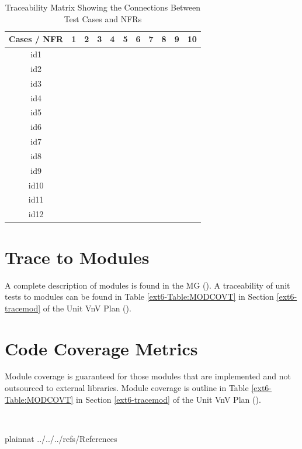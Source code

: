 \documentclass[12pt, titlepage]{article}
\begin{document}
\begin{table}[!h]
	\begin{center}
		\begin{tabular}{| c | c | c | c | c | c | c | c | c | c | c |}
			\hline
			Cases / NFR & 1 & 2 & 3 & 4 & 5 & 6 & 7 & 8 & 9 & 10\\
			\hline
			id1 & & & & & & & & & &\\
			\hline
			id2 & \checkmark& & & & & & & & &\\
			\hline
			id3 & & & & & & & & & &\\
			\hline
			id4 & & & & & & & & & &\\
			\hline
			id5 & & & & & & & & & &\\
			\hline
			id6 & & & & & & & & & &\\
			\hline
			id7 & & & & & & & & & &\\
			\hline
			id8 & \checkmark& & & & & & & & &\\
			\hline
			id9 & & & & & & & & & &\\
			\hline
			id10 & & & & & & & & & &\\
			\hline
			id11 & & & \checkmark& & & & & & &\\
			\hline
			id12 & & & & & & & & \checkmark& &\\
			\hline
		\end{tabular}
		\caption{Traceability Matrix Showing the Connections Between Test Cases and NFRs}
		\label{Table:TRCNFR}
	\end{center}
\end{table}  


\newpage
		
\section{Trace to Modules}	
\label{modulecoverage}	

A complete description of modules is found in the MG (\citet{LBM_MG_PM}). A traceability of unit tests to modules can be found in Table \ref{ext6-Table:MODCOVT} in Section \ref{ext6-tracemod} of the Unit VnV Plan (\citet{LBM_UVNV_PM}).

\section{Code Coverage Metrics}

Module coverage is guaranteed for those modules that are implemented and not outsourced to external libraries. Module coverage is outline in Table \ref{ext6-Table:MODCOVT} in Section \ref{ext6-tracemod} of the Unit VnV Plan (\citet{LBM_UVNV_PM}).

~\newpage

 {plainnat}
 {../../../refs/References}
\end{document}
